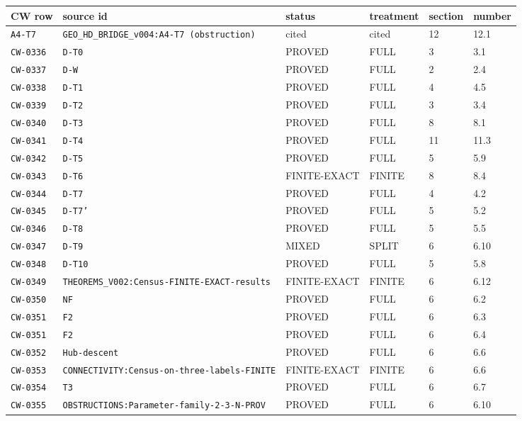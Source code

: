\begin{center}\scriptsize
\begin{longtable}{@{}llllll@{}}\toprule
CW row & source id & status & treatment & section & number\\\midrule\endhead
\texttt{A4-T7} & \texttt{GEO\_HD\_BRIDGE\_v004:A4-T7 (obstruction)} & cited & cited & 12 & 12.1\\
\texttt{CW-0336} & \texttt{D-T0} & PROVED & FULL & 3 & 3.1\\
\texttt{CW-0337} & \texttt{D-W} & PROVED & FULL & 2 & 2.4\\
\texttt{CW-0338} & \texttt{D-T1} & PROVED & FULL & 4 & 4.5\\
\texttt{CW-0339} & \texttt{D-T2} & PROVED & FULL & 3 & 3.4\\
\texttt{CW-0340} & \texttt{D-T3} & PROVED & FULL & 8 & 8.1\\
\texttt{CW-0341} & \texttt{D-T4} & PROVED & FULL & 11 & 11.3\\
\texttt{CW-0342} & \texttt{D-T5} & PROVED & FULL & 5 & 5.9\\
\texttt{CW-0343} & \texttt{D-T6} & FINITE-EXACT & FINITE & 8 & 8.4\\
\texttt{CW-0344} & \texttt{D-T7} & PROVED & FULL & 4 & 4.2\\
\texttt{CW-0345} & \texttt{D-T7'} & PROVED & FULL & 5 & 5.2\\
\texttt{CW-0346} & \texttt{D-T8} & PROVED & FULL & 5 & 5.5\\
\texttt{CW-0347} & \texttt{D-T9} & MIXED & SPLIT & 6 & 6.10\\
\texttt{CW-0348} & \texttt{D-T10} & PROVED & FULL & 5 & 5.8\\
\texttt{CW-0349} & \texttt{THEOREMS\_V002:Census-FINITE-EXACT-results} & FINITE-EXACT & FINITE & 6 & 6.12\\
\texttt{CW-0350} & \texttt{NF} & PROVED & FULL & 6 & 6.2\\
\texttt{CW-0351} & \texttt{F2} & PROVED & FULL & 6 & 6.3\\
\texttt{CW-0351} & \texttt{F2} & PROVED & FULL & 6 & 6.4\\
\texttt{CW-0352} & \texttt{Hub-descent} & PROVED & FULL & 6 & 6.6\\
\texttt{CW-0353} & \texttt{CONNECTIVITY:Census-on-three-labels-FINITE} & FINITE-EXACT & FINITE & 6 & 6.6\\
\texttt{CW-0354} & \texttt{T3} & PROVED & FULL & 6 & 6.7\\
\texttt{CW-0355} & \texttt{OBSTRUCTIONS:Parameter-family-2-3-N-PROV} & PROVED & FULL & 6 & 6.10\\

\end{longtable}
\end{center}
